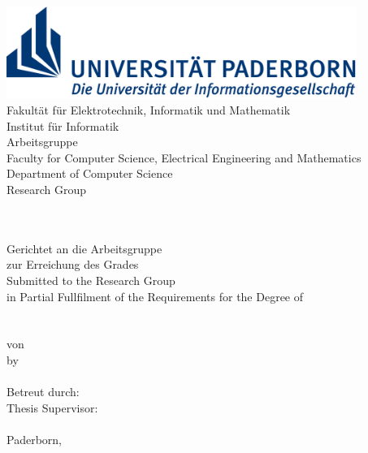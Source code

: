 \begin{titlepage}
	\begin{center}
		\begin{minipage}{135mm}
			\includegraphics[height=30mm]{figures/uni-logo}\\
			\ifgerman
				\textsf{
					\hspace*{20mm} Fakultät für Elektrotechnik,
					Informatik und Mathematik \\
					\hspace*{20mm} Institut für Informatik \\
					\hspace*{20mm} Arbeitsgruppe \theresearchgroup{} \\
				}
			\else
				\textsf{
					\hspace*{20mm} Faculty for Computer Science, 
					Electrical Engineering and Mathematics \\
					\hspace*{20mm} Department of Computer Science \\
					\hspace*{20mm} Research Group \theresearchgroup{} \\
				}
			\fi 
		\end{minipage}\\[40pt]

		{\huge \thethesistype{}}\\[5pt]
		\ifgerman
			Gerichtet an die Arbeitsgruppe \theresearchgroup{}\\
			zur Erreichung des Grades\\[5pt]
		\else
			Submitted to the \theresearchgroup{} Research Group\\
			in Partial Fullfilment of the Requirements
			for the Degree of\\[5pt]
		\fi 
		{\huge \thedegree{}}\\[30pt]

		{\Huge\textbf{\thetitle{}}}\\[30pt]

		\ifgerman
			von\\
		\else
			by\\
		\fi 
		{\Large\textsc{\theauthor{}}}\\[30pt]

		\ifgerman
			Betreut durch:\\
		\else
			Thesis Supervisor:\\
		\fi 
		{\large \thesupervisor{}}\\[30pt]

		Paderborn, \thesubmissiondate{}
	\end{center}
\end{titlepage}
